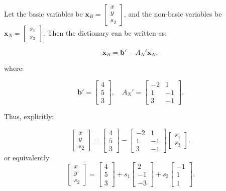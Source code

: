 \begin{tcolorbox}[colback=algopt!6, colframe=algopt, coltitle=white, fonttitle=\bfseries, sharp corners,
    title=\textbf{Final Dictionary in Matrix Notation}]
Let the basic variables be $\mathbf{x}_B = \begin{bmatrix} x \\ y \\ s_2 \end{bmatrix}$,
and the non-basic variables be $\mathbf{x}_N = \begin{bmatrix} s_1 \\ s_3 \end{bmatrix}$.
Then the dictionary can be written as:

$$
\mathbf{x}_B = \mathbf{b}' - A_N' \mathbf{x}_N,
$$

where:

$$
\mathbf{b}' =
\begin{bmatrix}
4 \\
5 \\
3
\end{bmatrix}, \quad
A_N' =
\begin{bmatrix}
-2 & 1 \\
1 & -1 \\
3 & -1
\end{bmatrix}.
$$

Thus, explicitly:

$$
\begin{bmatrix}
x \\
y \\
s_2
\end{bmatrix}
=
\begin{bmatrix}
4 \\
5 \\
3
\end{bmatrix}
-
\begin{bmatrix}
-2 & 1 \\
1 & -1 \\
3 & -1
\end{bmatrix}
\begin{bmatrix}
s_1 \\
s_3
\end{bmatrix}.
$$
or equivalently
$$
\begin{bmatrix}
x \\
y \\
s_2
\end{bmatrix}
=
\begin{bmatrix}
4 \\
5 \\
3
\end{bmatrix}
+
s_1
\begin{bmatrix}
2  \\
-1  \\
-3
\end{bmatrix}
 +s_3
\begin{bmatrix}
 -1 \\
 1 \\
 1
\end{bmatrix}.$$
\end{tcolorbox}

